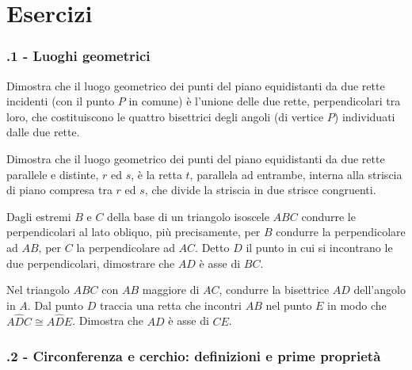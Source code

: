\section{Esercizi}

\subsubsection*{\thechapter.1 - Luoghi geometrici}

\begin{multicols}{2}

\begin{esercizio}
\label{ese:5.1}
Dimostra che il luogo geometrico dei punti del piano equidistanti da due rette incidenti (con il punto $P$ in comune) è l'unione delle due rette, perpendicolari tra loro, che costituiscono le quattro bisettrici degli angoli (di vertice $P$) individuati dalle due rette.
\end{esercizio}

\begin{esercizio}
\label{ese:5.2}
Dimostra che il luogo geometrico dei punti del piano equidistanti da due rette parallele e distinte, $r$ ed $s$, è la retta $t$, parallela ad entrambe, interna alla striscia di piano compresa tra $r$ ed $s$, che divide la striscia in due strisce congruenti.
\end{esercizio}

\begin{esercizio}
\label{ese:5.3}
Dagli estremi $B$ e $C$ della base di un triangolo isoscele $ABC$ condurre le perpendicolari al lato obliquo, più precisamente, per $B$ condurre la perpendicolare ad $AB$, per $C$ la perpendicolare ad $AC$. Detto $D$ il punto in cui si incontrano le due perpendicolari, dimostrare che $AD$ è asse di $BC$.
\end{esercizio}

\begin{esercizio}
\label{ese:5.4}
Nel triangolo $ABC$ con $AB$ maggiore di $AC$, condurre la bisettrice $AD$ dell'angolo in $A$. Dal punto $D$ traccia una retta che incontri $AB$ nel punto $E$ in modo che $A\widehat{D}C\cong A\widehat{D}E$. Dimostra che $AD$ è asse di $CE$.
\end{esercizio}

\end{multicols}
 
\subsubsection*{\thechapter.2 - Circonferenza e cerchio: definizioni e prime proprietà}

